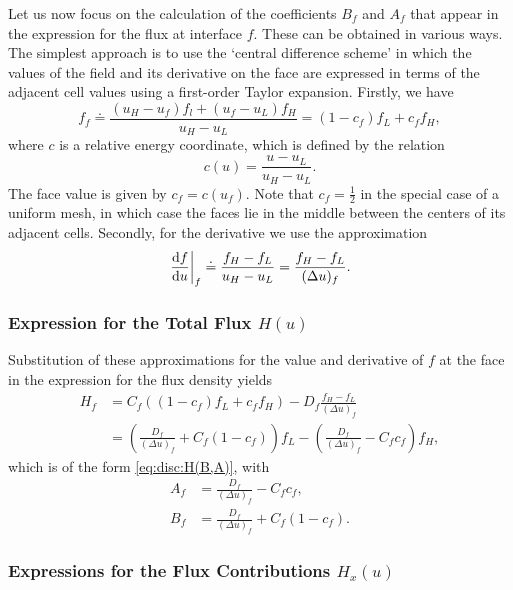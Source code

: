 \documentclass{book}
\begin{document}
Let us now focus on the calculation of the coefficients $B_f$ and $A_f$ that
appear in the expression for the flux at interface $f$. These can be obtained
in various ways. 
The simplest approach is to use the `central difference scheme'
in which the values of the field and its derivative on the face are expressed in
terms of the adjacent cell values using a first-order Taylor expansion.
Firstly, we have
\begin{equation}
	f_f \doteq \frac{(u_H-u_f)f_l + (u_f-u_L)f_H}{u_H-u_L} = (1-c_f)f_L+c_ff_H,
\end{equation}
where $c$ is a relative energy coordinate, which is defined by the relation
\begin{equation}
	c(u) = \frac{u-u_L}{u_H-u_L}.
	\label{eq:disc:c(u)}
\end{equation}
The face value is given by $c_f=c(u_f)$. Note that $c_f=\frac{1}{2}$ in the special
case of a uniform mesh, in which case the faces lie in the middle between the centers
of its adjacent cells.
Secondly, for the derivative we use the approximation
\begin{equation}
	\left.\DERIV{f}{u}\right|_{f}
	\doteq \frac{f_H-f_L}{u_H-u_L}
	= \frac{f_H-f_L}{(\Delta u)_f}.
\end{equation}

\subsubsection{Expression for the Total Flux $H(u)$}
Substitution of these approximations for the value and derivative of $f$ at the face
in the expression for the flux density yields
\begin{align}
	H_f &= C_f((1-c_f)f_L+c_ff_H) - D_f\frac{f_H-f_L}{(\Delta u)_f} \nonumber \\
	&= \left(\frac{D_f}{(\Delta u)_f}+C_f(1-c_f)\right)f_L - \left(\frac{D_f}{(\Delta u)_f}-C_fc_f\right)f_H,
	\label{eq:H_f:cd}
\end{align}
which is of the form \eqref{eq:disc:H(B,A)}, with
\begin{align}
	A_f &= \frac{D_f}{(\Delta u)_f}-C_fc_f,     \label{eq:disc:A_f-cd(C,D)} \\
	B_f &= \frac{D_f}{(\Delta u)_f}+C_f(1-c_f). \label{eq:disc:B_f-cd(C,D)}
\end{align}

\subsubsection{Expressions for the Flux Contributions $H_x(u)$}
\end{document}
